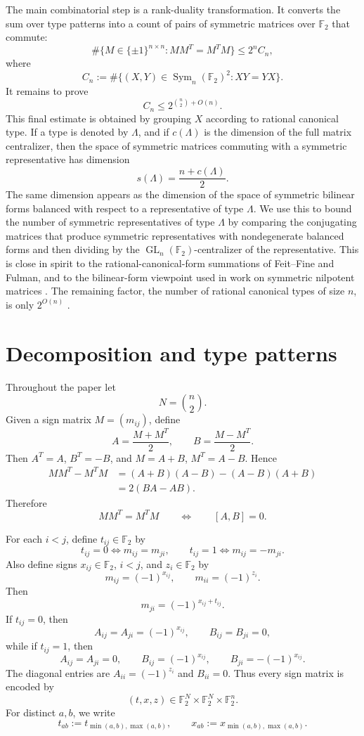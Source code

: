 \documentclass[11pt]{amsart}
\theoremstyle{remark}
\numberwithin{equation}{section}
\newcommand{\F}{\mathbb F}
\newcommand{\Sym}{\operatorname{Sym}}
\newcommand{\GL}{\operatorname{GL}}
\begin{document}
The main combinatorial step is a rank-duality transformation.  It converts the sum over type patterns into a count of pairs of symmetric matrices over $\F_2$ that commute:
\[
        \#\{M\in\{\pm1\}^{n\times n}:MM^T=M^TM\}
        \leq 2^n C_n,
\]
where
\[
        C_n:=\#\{(X,Y)\in\Sym_n(\F_2)^2:XY=YX\}.
\]
It remains to prove
\[
        C_n\leq 2^{\binom n2+O(n)}.
\]
This final estimate is obtained by grouping $X$ according to rational canonical type.  If a type is denoted by $\Lambda$, and if $c(\Lambda)$ is the dimension of the full matrix centralizer, then the space of symmetric matrices commuting with a symmetric representative has dimension
\[
        s(\Lambda)=\frac{n+c(\Lambda)}2.%
\]
The same dimension appears as the dimension of the space of symmetric bilinear forms balanced with respect to a representative of type $\Lambda$.  We use this to bound the number of symmetric representatives of type $\Lambda$ by comparing the conjugating matrices that produce symmetric representatives with nondegenerate balanced forms and then dividing by the $\GL_n(\F_2)$-centralizer of the representative.  This is close in spirit to the rational-canonical-form summations of Feit--Fine and Fulman, and to the bilinear-form viewpoint used in work on symmetric nilpotent matrices \cite{FeitFine1960,Fulman2002,BrouwerGowSheekey2014}.  The remaining factor, the number of rational canonical types of size $n$, is only $2^{O(n)}$ \cite{Green1955,Fulman2002,Stong1988}.

\section{Decomposition and type patterns}

Throughout the paper let
\[
        N=\binom n2.
\]
Given a sign matrix $M=(m_{ij})$, define
\[
        A=\frac{M+M^T}{2},\qquad B=\frac{M-M^T}{2}.
\]
Then $A^T=A$, $B^T=-B$, and $M=A+B$, $M^T=A-B$.  Hence
\begin{align*}
MM^T-M^TM
&=(A+B)(A-B)-(A-B)(A+B)  \\
&=2(BA-AB).
\end{align*}
Therefore
\begin{equation}\label{eq:normal-commutator}
        MM^T=M^TM\qquad\Longleftrightarrow\qquad [A,B]=0.
\end{equation}

For each $i<j$, define $t_{ij}\in\F_2$ by
\[
        t_{ij}=0\Longleftrightarrow m_{ij}=m_{ji},
        \qquad
        t_{ij}=1\Longleftrightarrow m_{ij}=-m_{ji}.
\]
Also define signs $x_{ij}\in\F_2$, $i<j$, and $z_i\in\F_2$ by
\[
        m_{ij}=(-1)^{x_{ij}},\qquad m_{ii}=(-1)^{z_i}.
\]
Then
\[
        m_{ji}=(-1)^{x_{ij}+t_{ij}}.
\]
If $t_{ij}=0$, then
\[
        A_{ij}=A_{ji}=(-1)^{x_{ij}},\qquad B_{ij}=B_{ji}=0,
\]
while if $t_{ij}=1$, then
\[
        A_{ij}=A_{ji}=0,\qquad B_{ij}=(-1)^{x_{ij}},\qquad B_{ji}=-(-1)^{x_{ij}}.
\]
The diagonal entries are $A_{ii}=(-1)^{z_i}$ and $B_{ii}=0$.  Thus every sign matrix is encoded by
\[
        (t,x,z)\in\F_2^N\times\F_2^N\times\F_2^n.
\]
For distinct $a,b$, we write
\[
        t_{ab}:=t_{\min(a,b),\max(a,b)},\qquad
        x_{ab}:=x_{\min(a,b),\max(a,b)}.
\]
\end{document}
